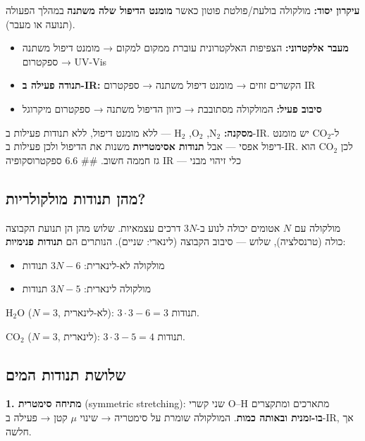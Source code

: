 \documentclass[
  hebrew,
  letterpaper,
  DIV=11,
  numbers=noendperiod]{scrreprt}
\providecommand{\tightlist}{%
  \setlength{\itemsep}{0pt}\setlength{\parskip}{0pt}}
\begin{document}
\textbf{עיקרון יסוד:} מולקולה בולעת/פולטת פוטון כאשר \textbf{מומנט
הדיפול שלה משתנה} במהלך הפעולה (תנועה או מעבר).

\begin{itemize}
\tightlist
\item
  \textbf{מעבר אלקטרוני:} הצפיפות האלקטרונית עוברת ממקום למקום → מומנט
  דיפול משתנה → ספקטרום UV-Vis
\item
  \textbf{תנודה פעילה ב-IR:} הקשרים זוזים → מומנט דיפול משתנה → ספקטרום
  IR
\item
  \textbf{סיבוב פעיל:} המולקולה מסתובבת → כיוון הדיפול משתנה → ספקטרום
  מיקרוגל
\end{itemize}

\textbf{מסקנה:} \(\text{N}_2\), \(\text{O}_2\), \(\text{H}_2\) --- ללא
מומנט דיפול, ללא תנודות פעילות ב-IR. ל-\(\text{CO}_2\) יש מומנט דיפול
אפסי --- אבל \textbf{תנודות אסימטריות} משנות את הדיפול ולכן פעילות ב-IR.
לכן \(\text{CO}_2\) הוא גז חממה חשוב. \#\# 6.6 ספקטרוסקופיה IR --- כלי
זיהוי מבני

\subsection{מהן תנודות
מולקולריות?}\label{ux5deux5d4ux5df-ux5eaux5e0ux5d5ux5d3ux5d5ux5ea-ux5deux5d5ux5dcux5e7ux5d5ux5dcux5e8ux5d9ux5d5ux5ea}

מולקולה עם \(N\) אטומים יכולה לנוע ב-\(3N\) דרכים עצמאיות. שלוש מהן הן
תנועת הקבוצה כולה (טרנסלציה), שלוש --- סיבוב הקבוצה (לינארי: שניים).
הנותרים הם \textbf{תנודות פנימיות}:

\begin{itemize}
\tightlist
\item
  מולקולה לא-לינארית: \(3N - 6\) תנודות
\item
  מולקולה לינארית: \(3N - 5\) תנודות
\end{itemize}

\textbf{\(\text{H}_2\text{O}\)} (\(N=3\), לא-לינארית): \(3\cdot3-6 = 3\)
תנודות.

\textbf{\(\text{CO}_2\)} (\(N=3\), לינארית): \(3\cdot3-5 = 4\) תנודות.

\subsection{שלושת תנודות
המים}\label{ux5e9ux5dcux5d5ux5e9ux5ea-ux5eaux5e0ux5d5ux5d3ux5d5ux5ea-ux5d4ux5deux5d9ux5dd}

\textbf{1. מתיחה סימטרית} (symmetric stretching): שני קשרי O--H מתארכים
ומתקצרים \textbf{בו-זמנית ובאותה כמות}. המולקולה שומרת על סימטריה →
שינוי \(\mu\) קטן → פעילה ב-IR, אך חלשה.
\end{document}
